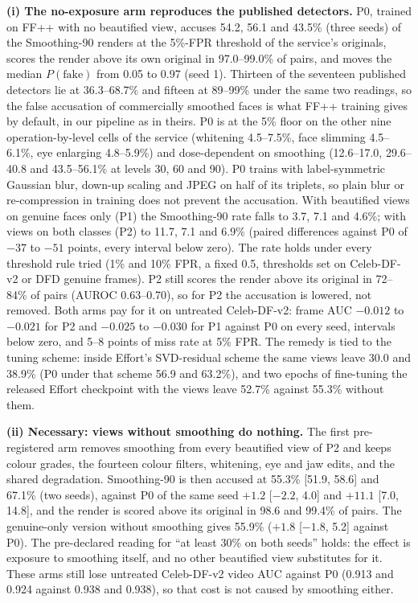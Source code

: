 \textbf{(i) The no-exposure arm reproduces the published detectors.} P0, trained on FF++ with no beautified view,
accuses 54.2, 56.1 and 43.5\% (three seeds) of the Smoothing-90 renders at the 5\%-FPR threshold of the service's
originals, scores the render above its own original in 97.0--99.0\% of pairs, and moves the median $P(\text{fake})$ from
0.05 to 0.97 (seed 1). Thirteen of the seventeen published detectors lie at 36.3--68.7\% and fifteen at 89--99\% under
the same two readings, so the false accusation of commercially smoothed faces is what FF++ training gives by default,
in our pipeline as in theirs. P0 is at the 5\% floor on the other nine operation-by-level cells of the service
(whitening 4.5--7.5\%, face slimming 4.5--6.1\%, eye enlarging 4.8--5.9\%) and dose-dependent on smoothing
(12.6--17.0, 29.6--40.8 and 43.5--56.1\% at levels 30, 60 and 90). P0 trains with label-symmetric Gaussian blur,
down-up scaling and JPEG on half of its triplets, so plain blur or re-compression in training does not prevent the
accusation. With beautified views on genuine faces only (P1) the Smoothing-90 rate falls to 3.7, 7.1 and 4.6\%; with
views on both classes (P2) to 11.7, 7.1 and 6.9\% (paired differences against P0 of $-37$ to $-51$ points, every
interval below zero). The rate holds under every threshold rule tried (1\% and 10\% FPR, a fixed 0.5, thresholds set on
Celeb-DF-v2 or DFD genuine frames). P2 still scores the render above its original in 72--84\% of pairs (AUROC
0.63--0.70), so for P2 the accusation is lowered, not removed. Both arms pay for it on untreated Celeb-DF-v2: frame AUC
$-0.012$ to $-0.021$ for P2 and $-0.025$ to $-0.030$ for P1 against P0 on every seed, intervals below zero, and 5--8 points
of miss rate at 5\% FPR. The remedy is tied to the tuning scheme: inside Effort's SVD-residual scheme the same views
leave 30.0 and 38.9\% (P0 under that scheme 56.9 and 63.2\%), and two epochs of fine-tuning the released Effort
checkpoint with the views leave 52.7\% against 55.3\% without them.

\textbf{(ii) Necessary: views without smoothing do nothing.} The first pre-registered arm removes smoothing from every
beautified view of P2 and keeps colour grades, the fourteen colour filters, whitening, eye and jaw edits, and the shared
degradation. Smoothing-90 is then accused at 55.3\% [51.9, 58.6] and 67.1\% (two seeds), against P0 of the same seed
$+1.2$ [$-2.2$, 4.0] and $+11.1$ [7.0, 14.8], and the render is scored above its original in 98.6 and 99.4\% of pairs. The
genuine-only version without smoothing gives 55.9\% ($+1.8$ [$-1.8$, 5.2] against P0). The pre-declared reading for
``at least 30\% on both seeds'' holds: the effect is exposure to smoothing itself, and no other beautified view
substitutes for it. These arms still lose untreated Celeb-DF-v2 video AUC against P0 (0.913 and 0.924 against 0.938 and
0.938), so that cost is not caused by smoothing either.

